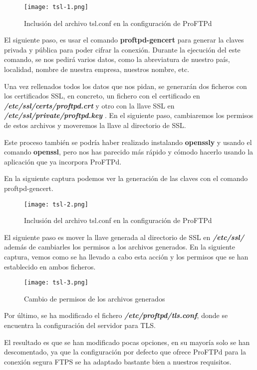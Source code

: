 \begin{figure}[H]
    \centering
    \texttt{[image: tsl-1.png]}
    \caption{Inclusión del archivo tsl.conf en la configuración de ProFTPd}
\end{figure}

El siguiente paso, es usar el comando \textbf{proftpd-gencert} para generar la claves privada y pública para poder cifrar la conexión. Durante la ejecución del este comando, se nos pedirá varios datos, como la abreviatura de nuestro país, localidad, nombre de nuestra empresa, nuestros nombre, etc.

Una vez rellenados todos los datos que nos pidan, se generarán dos ficheros con los certificados SSL, en concreto, un fichero con el certificado en \textbf{\textit{/etc/ssl/certs/proftpd.crt}} y otro con la llave SSL en \textbf{\textit{/etc/ssl/private/proftpd.key
}}. En el siguiente paso, cambiaremos los permisos de estos archivos y moveremos la llave al directorio de SSL.

Este proceso también se podría haber realizado instalando \textbf{openssly}  y usando el comando \textbf{openssl}, pero nos has parecido más rápido y cómodo hacerlo usando la aplicación que ya incorpora ProFTPd.

En la siguiente captura podemos ver la generación de las claves con el comando proftpd-gencert.

\begin{figure}[H]
    \centering
    \texttt{[image: tsl-2.png]}
    \caption{Inclusión del archivo tsl.conf en la configuración de ProFTPd}
\end{figure}

El siguiente paso es mover la llave generada al directorio de SSL en \textit{\textbf{/etc/ssl/}} además de cambiarles los permisos a los archivos generados. En la siguiente captura, vemos como se ha llevado a cabo esta acción y los permisos que se han establecido en ambos ficheros.

\begin{figure}[H]
    \centering
    \texttt{[image: tsl-3.png]}
    \caption{Cambio de permisos de los archivos generados}
\end{figure}

Por último, se ha modificado el fichero \textbf{\textit{/etc/proftpd/tls.conf}}, donde se encuentra la configuración del servidor para TLS.

El resultado es que se han modificado pocas opciones, en su mayoría solo se han descomentado, ya que la configuración por defecto que ofrece ProFTPd para la conexión segura FTPS se ha adaptado bastante bien a nuestros requisitos.

